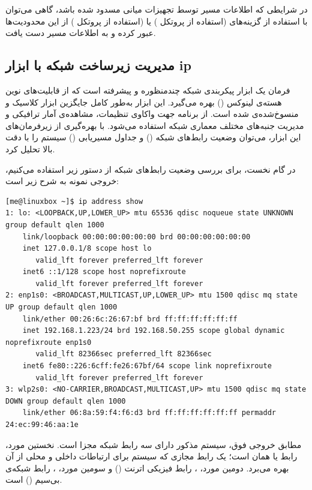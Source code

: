 در شرایطی که اطلاعات مسیر توسط تجهیزات میانی مسدود شده باشد، گاهی می‌توان با استفاده از گزینه‌های  (استفاده از پروتکل ) یا  (استفاده از پروتکل ) از این محدودیت‌ها عبور کرده و به اطلاعات مسیر دست یافت.

\subsection{مدیریت زیرساخت شبکه با ابزار ip}

فرمان  یک ابزار پیکربندی شبکه چندمنظوره و پیشرفته است که از قابلیت‌های نوین هسته‌ی لینوکس () بهره می‌گیرد. این ابزار به‌طور کامل جایگزین ابزار کلاسیک و منسوخ‌شده‌ی  شده است. از برنامه  جهت واکاوی تنظیمات، مشاهده‌ی آمار ترافیکی و مدیریت جنبه‌های مختلف معماری شبکه استفاده می‌شود. با بهره‌گیری از زیرفرمان‌های این ابزار، می‌توان وضعیت رابط‌های شبکه () و جداول مسیریابی () سیستم را با دقت بالا تحلیل کرد.

در گام نخست، برای بررسی وضعیت رابط‌های شبکه از دستور زیر استفاده می‌کنیم، خروجی نمونه به شرح زیر است:

\begin{latin}
\begin{lstlisting}
[me@linuxbox ~]$ ip address show
1: lo: <LOOPBACK,UP,LOWER_UP> mtu 65536 qdisc noqueue state UNKNOWN group default qlen 1000
    link/loopback 00:00:00:00:00:00 brd 00:00:00:00:00:00
    inet 127.0.0.1/8 scope host lo
       valid_lft forever preferred_lft forever
    inet6 ::1/128 scope host noprefixroute
       valid_lft forever preferred_lft forever
2: enp1s0: <BROADCAST,MULTICAST,UP,LOWER_UP> mtu 1500 qdisc mq state UP group default qlen 1000
    link/ether 00:26:6c:26:67:bf brd ff:ff:ff:ff:ff:ff
    inet 192.168.1.223/24 brd 192.168.50.255 scope global dynamic noprefixroute enp1s0
       valid_lft 82366sec preferred_lft 82366sec
    inet6 fe80::226:6cff:fe26:67bf/64 scope link noprefixroute
       valid_lft forever preferred_lft forever
3: wlp2s0: <NO-CARRIER,BROADCAST,MULTICAST,UP> mtu 1500 qdisc mq state DOWN group default qlen 1000
    link/ether 06:8a:59:f4:f6:d3 brd ff:ff:ff:ff:ff:ff permaddr 24:ec:99:46:aa:1e
\end{lstlisting}
\end{latin}

مطابق خروجی فوق، سیستم مذکور دارای سه رابط شبکه مجزا است. نخستین مورد، رابط  یا همان  است؛ یک رابط مجازی که سیستم برای ارتباطات داخلی و محلی از آن بهره می‌برد. دومین مورد، ، رابط فیزیکی اترنت () و سومین مورد، ، رابط شبکه‌ی بی‌سیم () است.

